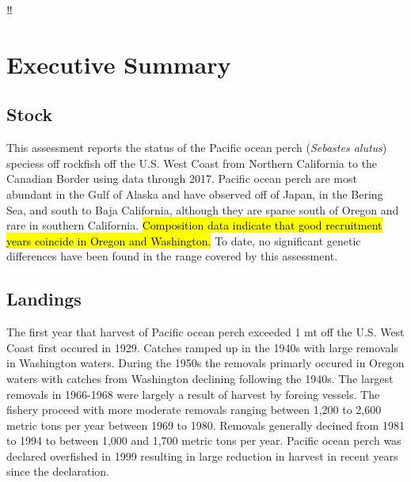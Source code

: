\documentclass[12pt,]{article}
\begin{document}
{
\setcounter{tocdepth}{4}
\tableofcontents
}
\setlength{\parskip}{5mm plus1mm minus1mm} \pagebreak

 \setcounter{page}{1}
\renewcommand{\thefigure}{\alph{figure}}
‼\renewcommand{\thetable}{\alph{table}}

\section*{Executive Summary}\label{executive-summary}

\subsection*{Stock}\label{stock}

This assessment reports the status of the Pacific ocean perch
(\emph{Sebastes alutus}) speciess off rockfish off the U.S. West Coast
from Northern California to the Canadian Border using data through 2017.
Pacific ocean perch are most abundant in the Gulf of Alaska and have
observed off of Japan, in the Bering Sea, and south to Baja California,
although they are sparse south of Oregon and rare in southern
California. \hl{Composition data indicate that
good recruitment years coincide in Oregon and Washington.} To date, no
significant genetic differences have been found in the range covered by
this assessment.

\subsection*{Landings}\label{landings}

The first year that harvest of Pacific ocean perch exceeded 1 mt off the
U.S. West Coast first occured in 1929. Catches ramped up in the 1940s
with large removals in Washington waters. During the 1950s the removals
primarly occured in Oregon waters with catches from Washington declining
following the 1940s. The largest removals in 1966-1968 were largely a
result of harvest by foreing vessels. The fishery proceed with more
moderate removals ranging between 1,200 to 2,600 metric tons per year
between 1969 to 1980. Removals generally decined from 1981 to 1994 to
between 1,000 and 1,700 metric tons per year. Pacific ocean perch was
declared overfished in 1999 resulting in large reduction in harvest in
recent years since the declaration.
\end{document}
